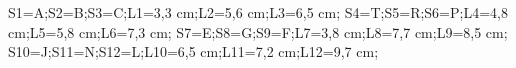 \documentclass[exercice]{thedocument}%
\begin{document}
%
\>S1=A;\>S2=B;\>S3=C;\>L1=3,3 cm;\>L2=5,6 cm;\>L3=6,5 cm;%
\>S4=T;\>S5=R;\>S6=P;\>L4=4,8 cm;\>L5=5,8 cm;\>L6=7,3 cm;%
\>S7=E;\>S8=G;\>S9=F;\>L7=3,8 cm;\>L8=7,7 cm;\>L9=8,5 cm;%
\>S10=J;\>S11=N;\>S12=L;\>L10=6,5 cm;\>L11=7,2 cm;\>L12=9,7 cm;%
%
\end{document}
